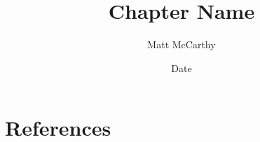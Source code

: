 \documentclass[12pt]{paper}
\title{Chapter Name}
\date{Date}
\author{Matt McCarthy}
\begin{document}
\maketitle



\section*{References}

\printbibliography
\end{document}
